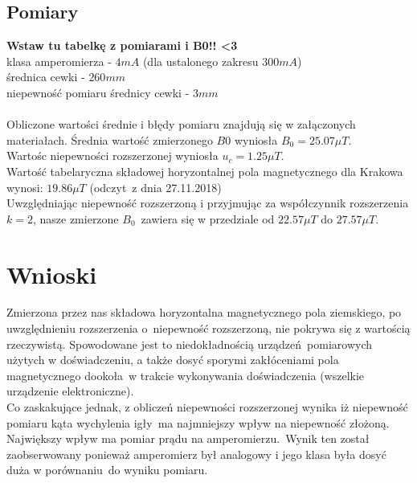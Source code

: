\documentclass[11pt]{article}
\begin{document}
\subsection{Pomiary}
\textbf{Wstaw tu tabelkę z pomiarami i B0!! <3}\\
klasa amperomierza - $4mA$ (dla ustalonego zakresu $300mA$)\\
średnica cewki - $260mm$\\
niepewność pomiaru średnicy cewki - $3mm$\\
\\
Obliczone wartości średnie i błędy pomiaru znajdują się w załączonych materiałach.
Średnia wartość zmierzonego $B{0}$ wyniosła $B_{0} = 25.07\mu T$.\\
Wartośc niepewności rozszerzonej wyniosła $u_{c} = 1.25\mu T$.\\
Wartość tabelaryczna składowej horyzontalnej pola magnetycznego dla Krakowa wynosi: $19.86\mu T$ (odczyt\
z dnia 27.11.2018)\\ 
Uwzględniając niepewność rozszerzoną i przyjmując za współczynnik rozszerzenia $k = 2$, nasze zmierzone $B_{0}$\
zawiera się w przedziale od $22.57\mu T$ do $27.57 \mu T$.
\section{Wnioski}
Zmierzona przez nas składowa horyzontalna magnetycznego pola ziemskiego, po uwzględnieniu rozszerzenia o\
niepewność rozszerzoną, nie pokrywa się z wartością rzeczywistą. Spowodowane jest to niedokładnością urządzeń\
pomiarowych użytych w doświadczeniu, a także dosyć sporymi zakłóceniami pola magnetycznego dookoła\
w trakcie wykonywania doświadczenia (wszelkie urządzenie elektroniczne).\\
Co zaskakujące jednak, z obliczeń niepewności rozszerzonej wynika iż niepewność pomiaru kąta wychylenia igły\
ma najmniejszy wpływ na niepewność złożoną. Największy wpływ ma pomiar prądu na amperomierzu.\
Wynik ten został zaobserwowany ponieważ amperomierz był analogowy i jego klasa była dosyć duża w porównaniu\
do wyniku pomiaru.
\end{document}
